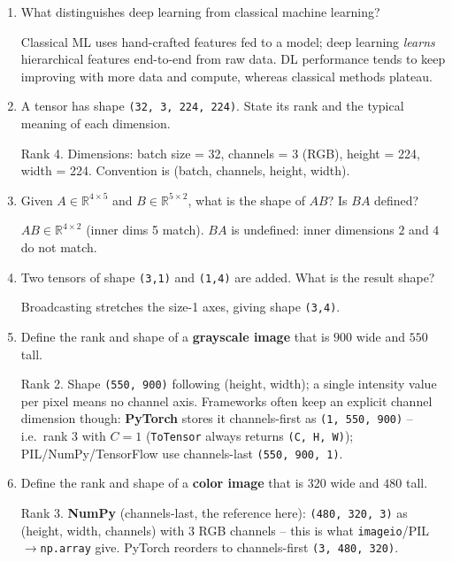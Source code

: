 \documentclass[10pt,a4paper]{article}
\newcommand{\q}[1]{\item #1}
\begin{document}
\begin{enumerate}[leftmargin=*,label=\textbf{Q\arabic*.}]

\q What distinguishes deep learning from classical machine learning?
\begin{answerbox}
Classical ML uses hand-crafted features fed to a model; deep learning \emph{learns} hierarchical features end-to-end from raw data. DL performance tends to keep improving with more data and compute, whereas classical methods plateau.
\end{answerbox}

\q A tensor has shape \texttt{(32, 3, 224, 224)}. State its rank and the typical meaning of each dimension.
\begin{answerbox}
Rank 4. Dimensions: batch size = 32, channels = 3 (RGB), height = 224, width = 224. Convention is (batch, channels, height, width).
\end{answerbox}

\q Given $A \in \mathbb{R}^{4\times 5}$ and $B \in \mathbb{R}^{5\times 2}$, what is the shape of $AB$? Is $BA$ defined?
\begin{answerbox}
$AB \in \mathbb{R}^{4\times 2}$ (inner dims 5 match). $BA$ is undefined: inner dimensions $2$ and $4$ do not match.
\end{answerbox}

\q Two tensors of shape \texttt{(3,1)} and \texttt{(1,4)} are added. What is the result shape?
\begin{answerbox}
Broadcasting stretches the size-1 axes, giving shape \texttt{(3,4)}.
\end{answerbox}

\q Define the rank and shape of a \textbf{grayscale image} that is $900$ wide and $550$ tall.
\begin{answerbox}
Rank 2. Shape \texttt{(550, 900)} following (height, width); a single intensity value per pixel means no channel axis. Frameworks often keep an explicit channel dimension though: \textbf{PyTorch} stores it channels-first as \texttt{(1, 550, 900)} -- i.e.\ rank 3 with $C=1$ (\texttt{ToTensor} always returns \texttt{(C, H, W)}); PIL/NumPy/TensorFlow use channels-last \texttt{(550, 900, 1)}.
\end{answerbox}

\q Define the rank and shape of a \textbf{color image} that is $320$ wide and $480$ tall.
\begin{answerbox}
Rank 3. \textbf{NumPy} (channels-last, the reference here): \texttt{(480, 320, 3)} as (height, width, channels) with 3 RGB channels -- this is what \texttt{imageio}/PIL$\to$\texttt{np.array} give. PyTorch reorders to channels-first \texttt{(3, 480, 320)}.
\end{answerbox}


\end{enumerate}
\end{document}
